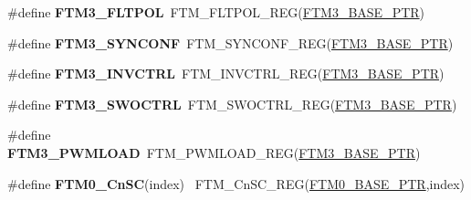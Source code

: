 \begin{DoxyCompactItemize}
\item 
\hypertarget{group___f_t_m___register___accessor___macros_gaa17801a9507cce8b776cb2b2165e7018}{}\#define {\bfseries F\+T\+M3\+\_\+\+F\+L\+T\+P\+O\+L}~F\+T\+M\+\_\+\+F\+L\+T\+P\+O\+L\+\_\+\+R\+E\+G(\hyperlink{group___f_t_m___peripheral_ga32dd0c357080d5680c0c5b3cf821adab}{F\+T\+M3\+\_\+\+B\+A\+S\+E\+\_\+\+P\+T\+R})\label{group___f_t_m___register___accessor___macros_gaa17801a9507cce8b776cb2b2165e7018}

\item 
\hypertarget{group___f_t_m___register___accessor___macros_ga3248b3ea1958036f9eca57049655f80b}{}\#define {\bfseries F\+T\+M3\+\_\+\+S\+Y\+N\+C\+O\+N\+F}~F\+T\+M\+\_\+\+S\+Y\+N\+C\+O\+N\+F\+\_\+\+R\+E\+G(\hyperlink{group___f_t_m___peripheral_ga32dd0c357080d5680c0c5b3cf821adab}{F\+T\+M3\+\_\+\+B\+A\+S\+E\+\_\+\+P\+T\+R})\label{group___f_t_m___register___accessor___macros_ga3248b3ea1958036f9eca57049655f80b}

\item 
\hypertarget{group___f_t_m___register___accessor___macros_gaf358fb06859256f9d1c160517c4edc09}{}\#define {\bfseries F\+T\+M3\+\_\+\+I\+N\+V\+C\+T\+R\+L}~F\+T\+M\+\_\+\+I\+N\+V\+C\+T\+R\+L\+\_\+\+R\+E\+G(\hyperlink{group___f_t_m___peripheral_ga32dd0c357080d5680c0c5b3cf821adab}{F\+T\+M3\+\_\+\+B\+A\+S\+E\+\_\+\+P\+T\+R})\label{group___f_t_m___register___accessor___macros_gaf358fb06859256f9d1c160517c4edc09}

\item 
\hypertarget{group___f_t_m___register___accessor___macros_ga715bca5a88cb03ccc4be1e05941e1272}{}\#define {\bfseries F\+T\+M3\+\_\+\+S\+W\+O\+C\+T\+R\+L}~F\+T\+M\+\_\+\+S\+W\+O\+C\+T\+R\+L\+\_\+\+R\+E\+G(\hyperlink{group___f_t_m___peripheral_ga32dd0c357080d5680c0c5b3cf821adab}{F\+T\+M3\+\_\+\+B\+A\+S\+E\+\_\+\+P\+T\+R})\label{group___f_t_m___register___accessor___macros_ga715bca5a88cb03ccc4be1e05941e1272}

\item 
\hypertarget{group___f_t_m___register___accessor___macros_gaf28e1c07af8bfac8e2b08685fc76dc15}{}\#define {\bfseries F\+T\+M3\+\_\+\+P\+W\+M\+L\+O\+A\+D}~F\+T\+M\+\_\+\+P\+W\+M\+L\+O\+A\+D\+\_\+\+R\+E\+G(\hyperlink{group___f_t_m___peripheral_ga32dd0c357080d5680c0c5b3cf821adab}{F\+T\+M3\+\_\+\+B\+A\+S\+E\+\_\+\+P\+T\+R})\label{group___f_t_m___register___accessor___macros_gaf28e1c07af8bfac8e2b08685fc76dc15}

\item 
\hypertarget{group___f_t_m___register___accessor___macros_gab814674d51c891d126e710ac2770559b}{}\#define {\bfseries F\+T\+M0\+\_\+\+Cn\+S\+C}(index)                                              ~F\+T\+M\+\_\+\+Cn\+S\+C\+\_\+\+R\+E\+G(\hyperlink{group___f_t_m___peripheral_gae712c29b7abcf338d8f8f6418683fa66}{F\+T\+M0\+\_\+\+B\+A\+S\+E\+\_\+\+P\+T\+R},index)\label{group___f_t_m___register___accessor___macros_gab814674d51c891d126e710ac2770559b}


\end{DoxyCompactItemize}
